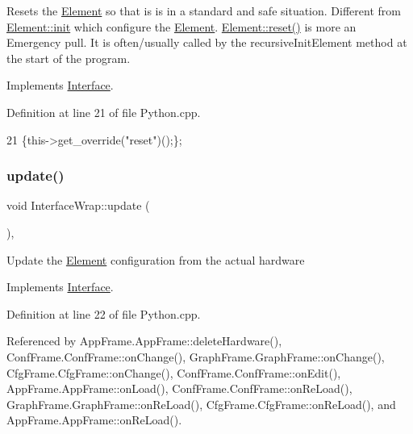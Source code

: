 Resets the \hyperlink{classElement}{Element} so that is is in a standard and safe situation. Different from \hyperlink{classElement_af42754b5cabc198869222725218d695c}{Element\+::init} which configure the \hyperlink{classElement}{Element}. \hyperlink{classElement_a69efffa22f06909d768149715565cb56}{Element\+::reset()} is more an Emergency pull. It is often/usually called by the recursive\+Init\+Element method at the start of the program. 

Implements \hyperlink{classInterface_a4d44329cea9981a9e0392eaaf99efadd}{Interface}.



Definition at line 21 of file Python.\+cpp.


\begin{DoxyCode}
21 \{this->get\_override(\textcolor{stringliteral}{"reset"})();\};
\end{DoxyCode}
\mbox{\label{structInterfaceWrap_aee2f0407da52a1de8659b1d83af62238}} 
\subsubsection{\texorpdfstring{update()}{update()}}
{\footnotesize\ttfamily void Interface\+Wrap\+::update (\begin{DoxyParamCaption}{ }\end{DoxyParamCaption})\hspace{0.3cm}{\ttfamily [inline]}, {\ttfamily [virtual]}}

Update the \hyperlink{classElement}{Element} configuration from the actual hardware 

Implements \hyperlink{classInterface_a30e71ffbe36091df9f7c0838dd4b60d2}{Interface}.



Definition at line 22 of file Python.\+cpp.



Referenced by App\+Frame.\+App\+Frame\+::delete\+Hardware(), Conf\+Frame.\+Conf\+Frame\+::on\+Change(), Graph\+Frame.\+Graph\+Frame\+::on\+Change(), Cfg\+Frame.\+Cfg\+Frame\+::on\+Change(), Conf\+Frame.\+Conf\+Frame\+::on\+Edit(), App\+Frame.\+App\+Frame\+::on\+Load(), Conf\+Frame.\+Conf\+Frame\+::on\+Re\+Load(), Graph\+Frame.\+Graph\+Frame\+::on\+Re\+Load(), Cfg\+Frame.\+Cfg\+Frame\+::on\+Re\+Load(), and App\+Frame.\+App\+Frame\+::on\+Re\+Load().


